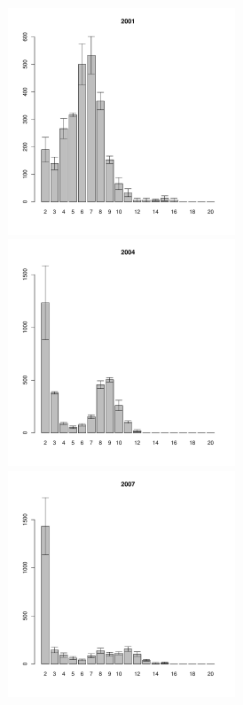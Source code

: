 \documentclass[12pt, a4paper]{article}
\begin{document}
\newpage \begin{figure}[h] 

\begin{multicols}{3}
\hfill
\includegraphics[width=60mm]{../White_Sea/Estuatiy_Luvenga/sizestr2_2001_.pdf}
\hfill
\includegraphics[width=60mm]{../White_Sea/Estuatiy_Luvenga/sizestr2_2004_.pdf}
\hfill
\includegraphics[width=60mm]{../White_Sea/Estuatiy_Luvenga/sizestr2_2007_.pdf}
\end{multicols}


\end{figure}
\end{document}
